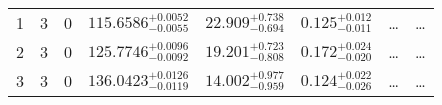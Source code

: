 \begin{table*}[!]
\begin{tabular}{llcrrlrc}
1 & 3 & 0 & $    115.6586_{-      0.0055}^{+      0.0052}$ & $      22.909_{-       0.694}^{+       0.738}$ & $       0.125_{-       0.011}^{+       0.012}$ & \multicolumn{1}{c}{\dots} & \dots \\[1pt]
2 & 3 & 0 & $    125.7746_{-      0.0092}^{+      0.0096}$ & $      19.201_{-       0.808}^{+       0.723}$ & $       0.172_{-       0.020}^{+       0.024}$ & \multicolumn{1}{c}{\dots} & \dots \\[1pt]
3 & 3 & 0 & $    136.0423_{-      0.0119}^{+      0.0126}$ & $      14.002_{-       0.959}^{+       0.977}$ & $       0.124_{-       0.026}^{+       0.022}$ & \multicolumn{1}{c}{\dots} & \dots \\[1pt]
\hline
\end{tabular}
\end{table*}
